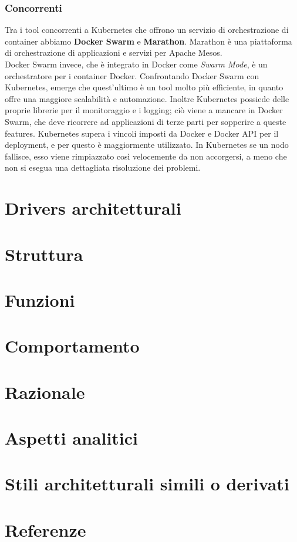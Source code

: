 \documentclass[12pt, a4paper]{report}
\begin{document}
\subsection{Concorrenti}
Tra i tool concorrenti a Kubernetes che offrono un servizio di orchestrazione di container abbiamo \textbf{Docker Swarm} e \textbf{Marathon}. Marathon è una piattaforma di orchestrazione di applicazioni e servizi per Apache Mesos.\\
Docker Swarm invece, che è integrato in Docker come \textit{Swarm Mode}, è un orchestratore per i container Docker. Confrontando Docker Swarm con Kubernetes, emerge che quest'ultimo è un tool molto più efficiente, in quanto offre una maggiore scalabilità e automazione. Inoltre Kubernetes possiede delle proprie librerie per il monitoraggio e i logging; ciò viene a mancare in Docker Swarm, che deve ricorrere ad applicazioni di terze parti per sopperire a queste features.
Kubernetes supera i vincoli imposti da Docker e Docker API per il deployment, e per questo è maggiormente utilizzato. In Kubernetes se un nodo fallisce, esso viene rimpiazzato così velocemente da non accorgersi, a meno che non si esegua una dettagliata risoluzione dei problemi.

\chapter{Drivers architetturali}
\chapter{Struttura}
\chapter{Funzioni}
\chapter{Comportamento}
\chapter{Razionale}
\chapter{Aspetti analitici}
\chapter{Stili architetturali simili o derivati}
\chapter{Referenze}
\end{document}
